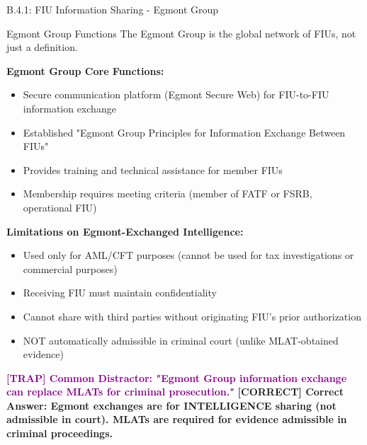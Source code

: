 \documentclass[11pt,a4paper]{beamer}
\newcommand{\trap}[1]{\textcolor{purple}{\textbf{[TRAP] #1}}}
\newcommand{\correct}[1]{\textcolor{green!50!black}{\textbf{[CORRECT] #1}}}
\begin{document}
	\begin{frame}{B.4.1: FIU Information Sharing - Egmont Group}
		\begin{block}{Egmont Group Functions}
			The Egmont Group is the global network of FIUs, not just a definition.
		\end{block}
		\textbf{Egmont Group Core Functions:}
		\begin{itemize}
			\item Secure communication platform (Egmont Secure Web) for FIU-to-FIU information exchange
			\item Established "Egmont Group Principles for Information Exchange Between FIUs"
			\item Provides training and technical assistance for member FIUs
			\item Membership requires meeting criteria (member of FATF or FSRB, operational FIU)
		\end{itemize}
		\textbf{Limitations on Egmont-Exchanged Intelligence:}
		\begin{itemize}
			\item Used only for AML/CFT purposes (cannot be used for tax investigations or commercial purposes)
			\item Receiving FIU must maintain confidentiality
			\item Cannot share with third parties without originating FIU's prior authorization
			\item NOT automatically admissible in criminal court (unlike MLAT-obtained evidence)
		\end{itemize}
		\trap{Common Distractor: "Egmont Group information exchange can replace MLATs for criminal prosecution."}
		\correct{Correct Answer: Egmont exchanges are for INTELLIGENCE sharing (not admissible in court). MLATs are required for evidence admissible in criminal proceedings.}
	\end{frame}
	
\end{document}
